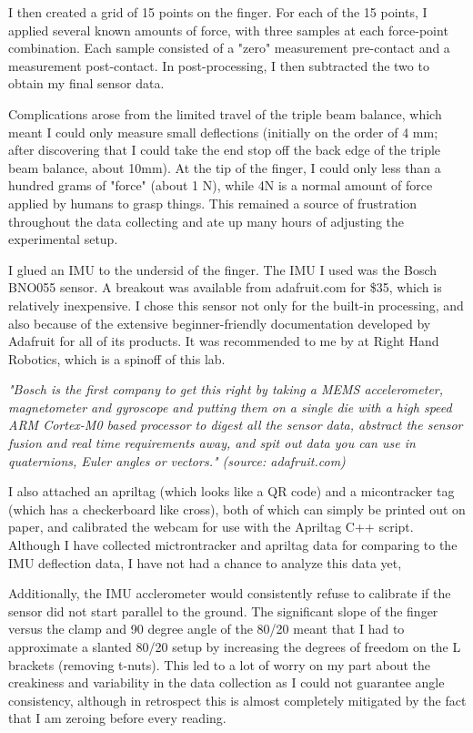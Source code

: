\documentclass[12pt]{article}
\begin{document}
I then created a grid of 15 points on the finger. For each of the 15 points, I applied several known
amounts of force, with three samples at each force-point combination. Each sample consisted of a
"zero" measurement pre-contact and a measurement post-contact. In post-processing, I then subtracted
the two to obtain my final sensor data.

Complications arose from the limited travel of the triple beam balance, which meant I could only
measure small deflections (initially on the order of 4 mm; after discovering that I could take the
end stop off the back edge of the triple beam balance, about 10mm). At the tip of the finger, I
could only less than a hundred grams of "force" (about 1 N), while 4N is a normal amount of force
applied by humans to grasp things. This remained a source of frustration throughout the data
collecting and ate up many hours of adjusting the experimental setup. 

I glued an IMU to the undersid of the finger. The IMU I used was the Bosch BNO055 sensor. A breakout
was available from adafruit.com for \$35, which is relatively inexpensive.  I chose this sensor not
only for the built-in processing, and also because of the extensive beginner-friendly documentation
developed by Adafruit for all of its products. It was recommended to me by 
at Right Hand Robotics, which is a spinoff of this lab.

\textit{"Bosch is the first company to get this right by taking a MEMS accelerometer, magnetometer and
    gyroscope and putting them on a single die with a high speed ARM Cortex-M0 based processor to digest
    all the sensor data, abstract the sensor fusion and real time requirements away, and spit out data
you can use in quaternions, Euler angles or vectors." (source: adafruit.com)}

I also attached an apriltag (which looks like a QR code) and a micontracker tag (which has a
checkerboard like cross), both of which can simply be printed out on paper, and calibrated the
webcam for use with the Apriltag C++ script. Although I have collected mictrontracker and apriltag
data for comparing to the IMU deflection data, I have not had a chance to analyze this data yet,

Additionally, the IMU acclerometer would consistently refuse to calibrate if the sensor did not
start parallel to the ground. The significant slope of the finger versus the clamp and 90 degree
angle of the 80/20 meant that I had to approximate a slanted 80/20 setup by increasing the degrees
of freedom on the L brackets (removing t-nuts). This led to a lot of worry on my part about the
creakiness and variability in the data collection as I could not guarantee angle consistency,
although in retrospect this is almost completely mitigated by the fact that I am zeroing before
every reading. 
\end{document}
